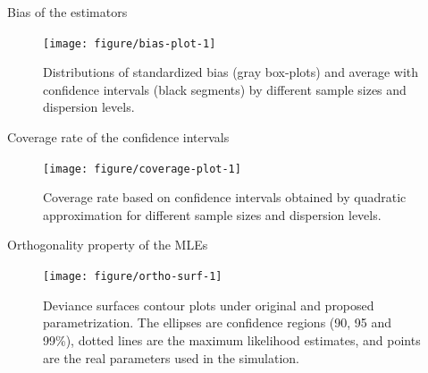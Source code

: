 \documentclass[11pt]{beamer}\usepackage[]{graphicx}\usepackage[]{color}
\begin{document}
\begin{frame}{Bias of the estimators}

\vspace{-0.5cm}
\begin{figure}[!htb]

{\centering \texttt{[image: figure/bias-plot-1]} 

}

\caption[Distributions of standardized bias (gray box-plots) and average with confidence intervals (black segments) by different sample sizes and dispersion levels]{Distributions of standardized bias (gray box-plots) and average with confidence intervals (black segments) by different sample sizes and dispersion levels.}\label{fig:bias-plot}
\end{figure}



\end{frame}

\begin{frame}{Coverage rate of the confidence intervals}

\begin{figure}[!htb]

{\centering \texttt{[image: figure/coverage-plot-1]} 

}

\caption[Coverage rate based on confidence intervals obtained by quadratic approximation for different sample sizes and dispersion levels]{Coverage rate based on confidence intervals obtained by quadratic approximation for different sample sizes and dispersion levels.}\label{fig:coverage-plot}
\end{figure}



\end{frame}

\begin{frame}{Orthogonality property of the MLEs}
\vspace{-0.3cm}

\begin{figure}[!htb]

{\centering \texttt{[image: figure/ortho-surf-1]} 

}

\caption[Deviance surfaces contour plots under original and proposed parametrization]{Deviance surfaces contour plots under original and proposed parametrization. The ellipses are confidence regions (90, 95 and 99\%), dotted lines are the maximum likelihood estimates, and points are the real parameters used in the simulation.}\label{fig:ortho-surf}
\end{figure}



\end{frame}
\end{document}
